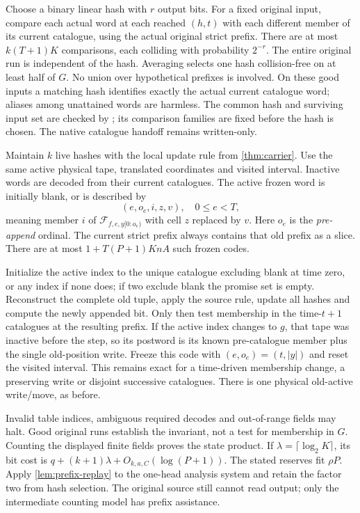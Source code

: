 \begin{informalproof}
Choose a binary linear hash with $r$ output bits. For a fixed original input,
compare each actual word at each reached $(h,t)$ with each different member
of its current catalogue, using the actual original strict prefix. There
are at most $k(T+1)K$ comparisons, each colliding with probability $2^{-r}$.
The entire original run is independent of the hash. Averaging selects one
hash collision-free on at least half of $G$. No union over hypothetical
prefixes is involved. On these good inputs a matching hash identifies exactly
the actual current catalogue word; aliases among unattained words are harmless.
The common hash and surviving input set are checked by
; its comparison families are fixed before
the hash is chosen. The native catalogue handoff remains written-only.

Maintain $k$ live hashes with the local update rule from \cref{thm:carrier}.
Use the same active physical tape, translated coordinates and visited interval.
Inactive words are decoded from their current catalogues. The active frozen
word is initially blank, or is described by
\[
 (e,o_e,i,z,v),\quad 0\le e<T,
\]
meaning member $i$ of $\mathcal F_{f,e,y[0:o_e)}$ with cell $z$ replaced by
$v$. Here $o_e$ is the \emph{pre-append} ordinal. The current strict prefix
always contains that old prefix as a slice. There are at most
$1+T(P+1)KnA$ such frozen codes.

Initialize the active index to the unique catalogue excluding blank at time
zero, or any index if none does; if two exclude blank the promise set is
empty. Reconstruct the complete old tuple, apply the source rule, update all
hashes and compute the newly appended bit. Only then test membership in the
time-$t+1$ catalogues at the resulting prefix. If the active index changes
to $g$, that tape was inactive before the step, so its postword is its known
pre-catalogue member plus the single old-position write. Freeze this code
with $(e,o_e)=(t,|y|)$ and reset the visited interval. This remains exact for
a time-driven membership change, a preserving write or disjoint successive
catalogues. There is one physical old-active write/move, as before.

Invalid table indices, ambiguous required decodes and out-of-range fields may
halt. Good original runs establish the invariant, not a test for membership
in $G$. Counting the displayed finite fields proves the state product.
If $\lambda=\lceil\log_2K\rceil$, its bit cost is
$q+(k+1)\lambda+O_{k,a,C}(\log(P+1))$. The stated reserves fit $\rho P$.
Apply \cref{lem:prefix-replay} to the one-head analysis system and retain the
factor two from hash selection. The original source still cannot read output;
only the intermediate counting model has prefix assistance.
\end{informalproof}

